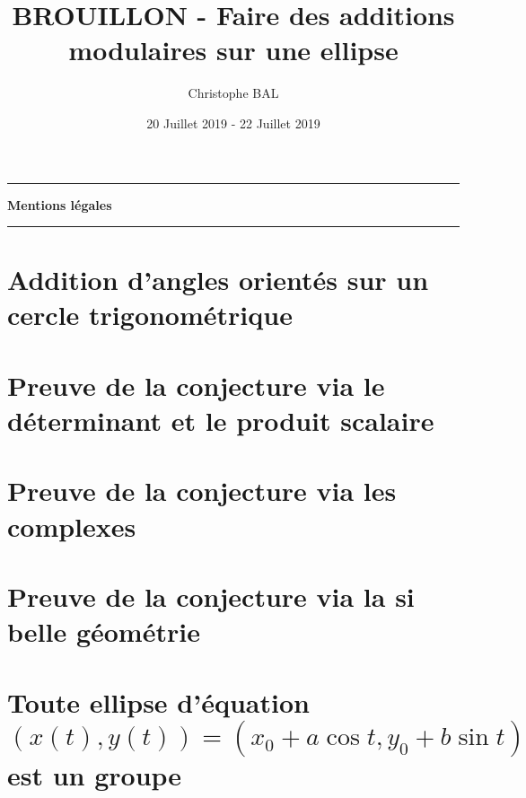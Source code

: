 \documentclass[12pt]{amsart}
\begin{document}
\title{BROUILLON - Faire des additions modulaires sur une ellipse}
\author{Christophe BAL}
\date{20 Juillet 2019 - 22 Juillet 2019}
\maketitle


\begin{center}
	\hrule\vspace{.3em}
	{
		\fontsize{1.35em}{1em}\selectfont
		\textbf{Mentions \og légales \fg}
	}
			
	\vspace{0.45em}
	\doclicenseThis
	\hrule
\end{center}



\setcounter{tocdepth}{2}
\tableofcontents




\newpage
\section{Addition d'angles orientés sur un cercle trigonométrique}





\section{Preuve de la conjecture via le déterminant et le produit scalaire} 





\section{Preuve de la conjecture via les complexes}
                        




\section{Preuve de la conjecture via la si belle géométrie} 




\section{\texorpdfstring{Toute ellipse d'équation $(x(t) , y(t)) = (x_0 + a \cos t , y_0 + b \sin t)$ est un groupe}%
                        {Toute ellipse d'équation (x(t) , y(t)) = (x0 + a cos t , y0 + b sin t) est un groupe}}
      

\end{document}
